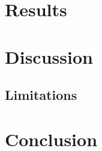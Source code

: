 \documentclass[notitlepage,12pt]{article}
\begin{document}
\section{Results}

\section{Discussion}

\subsection{Limitations}

\section{Conclusion}



\end{document}
